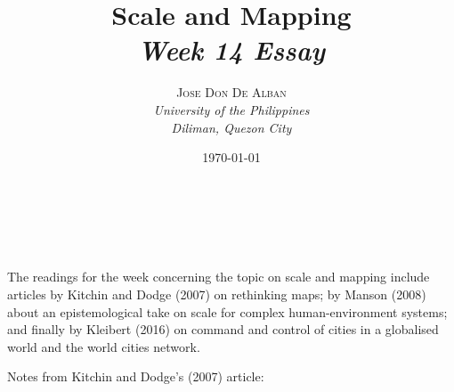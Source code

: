 \documentclass[a4paper, 10.5pt]{article} %
\title{\textbf{Scale and Mapping}\\ %
\textsl{Week 14 Essay}} %
\author{\textsc{Jose Don De Alban} %
\\{\textit{University of the Philippines} %
\\{\textit{Diliman, Quezon City}}}} %
\date{\today} %
\makeatletter
\renewcommand{\maketitle}
{
\begin{flushright} %
{\LARGE\@title} %
\vspace{40pt} %

{\large\@author} %
\\\@date %

\vspace{10pt} %
\end{flushright}
}
\makeatother
\begin{document}
\maketitle %


\section*{}

The readings for the week concerning the topic on scale and mapping include articles by Kitchin and Dodge (2007) \cite{kitchin_dodge_2007} on rethinking maps; by Manson (2008) \cite{manson_2008} about an epistemological take on scale for complex human-environment systems; and finally by Kleibert (2016) \cite{kleibert_2016} on command and control of cities in a globalised world and the world cities network.

\vspace{10pt}

Notes from Kitchin and Dodge's (2007) article:
\end{document}
